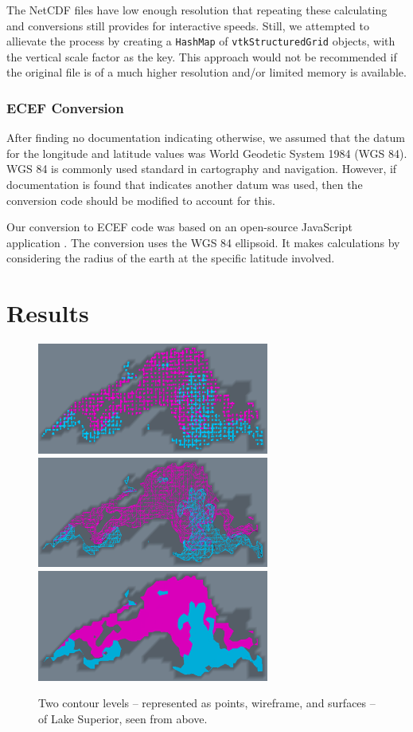 \documentclass{article} %
\newcommand{\code}[1]{\texttt{#1}}
\begin{document}
The NetCDF files have low enough resolution that repeating these calculating and conversions still provides for interactive speeds.  Still, we attempted to allievate the process by creating a \code{HashMap} of \code{vtkStructuredGrid} objects, with the vertical scale factor as the key.  This approach would not be recommended if the original file is of a much higher resolution and/or limited memory is available.

\subsubsection{ECEF Conversion}

After finding no documentation indicating otherwise, we assumed that the datum for the longitude and latitude values was World Geodetic System 1984 (WGS 84).  WGS 84 is commonly used standard in cartography and navigation.  However, if documentation is found that indicates another datum was used, then the conversion code should be modified to account for this.

Our conversion to ECEF code was based on an open-source JavaScript application \cite{geodesy}.  The conversion uses the WGS 84 ellipsoid.  It makes calculations by considering the radius of the earth at the specific latitude involved.

\section{Results}

\begin{figure}[htb]
   \centering
   \includegraphics[width=3in]{figures/points.eps}
   \includegraphics[width=3in]{figures/wireframe.eps}
   \includegraphics[width=3in]{figures/surface.eps}
    \caption{Two contour levels -- represented as points, wireframe, and surfaces -- of Lake Superior, seen from above.}
   \label{fig:rep1}
\end{figure}
\end{document}
